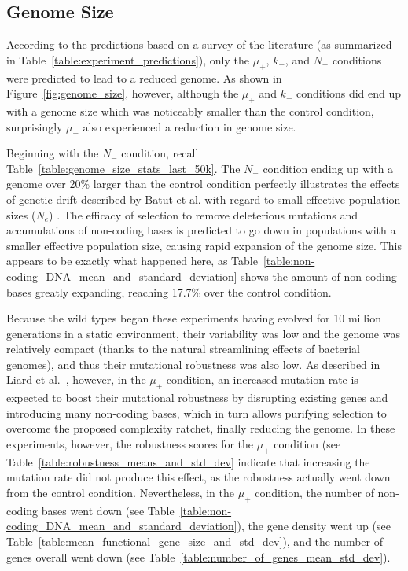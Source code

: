 \subsection{Genome Size}

According to the predictions based on a survey of the literature (as summarized in Table~\ref{table:experiment_predictions}), only the $\mu_+$, $k_-$, and $N_+$ conditions were predicted to lead to a reduced genome. As shown in Figure~\ref{fig:genome_size}, however, although the $\mu_+$ and $k_-$ conditions did end up with a genome size which was noticeably smaller than the control condition, surprisingly $\mu_-$ also experienced a reduction in genome size. %

Beginning with the $N_-$ condition, recall Table~\ref{table:genome_size_stats_last_50k}. The $N_-$ condition ending up with a genome over 20\% larger than the control condition perfectly illustrates the effects of genetic drift described by Batut et al. with regard to small effective population sizes ($N_e$) \cite{Batut.2014}. The efficacy of selection to remove deleterious mutations and accumulations of non-coding bases is predicted to go down in populations with a smaller effective population size, causing rapid expansion of the genome size. This appears to be exactly what happened here, as Table~\ref{table:non-coding_DNA_mean_and_standard_deviation} shows the amount of non-coding bases greatly expanding, reaching 17.7\% over the control condition. 

Because the wild types began these experiments having evolved for 10 million generations in a static environment, their variability was low and the genome was relatively compact (thanks to the natural streamlining effects of bacterial genomes), and thus their mutational robustness was also low. As described in Liard et al.~\cite{Liard.2018}, however, in the $\mu_+$ condition, an increased mutation rate is expected to boost their mutational robustness by disrupting existing genes and introducing many non-coding bases, which in turn allows purifying selection to overcome the proposed complexity ratchet, finally reducing the genome. In these experiments, however, the robustness scores for the $\mu_+$ condition (see Table~\ref{table:robustness_means_and_std_dev} indicate that increasing the mutation rate did not produce this effect, as the robustness actually went down from the control condition. Nevertheless, in the $\mu_+$ condition, the number of non-coding bases went down (see Table~\ref{table:non-coding_DNA_mean_and_standard_deviation}), the gene density went up (see Table~\ref{table:mean_functional_gene_size_and_std_dev}), and the number of genes overall went down (see Table~\ref{table:number_of_genes_mean_std_dev}). %

